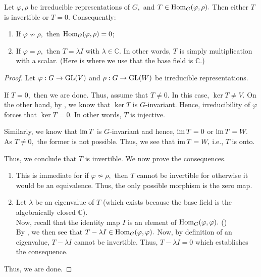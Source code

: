 \begin{lem} \label{lem:schur}
	Let $\varphi, \rho$ be irreducible representations of $G,$ and $T \in \operatorname{Hom}_{G}(\varphi, \rho).$ Then either $T$ is invertible or $T = 0.$ Consequently:
	\begin{enumerate}
		\item If $\varphi \not\sim \rho,$ then $\operatorname{Hom}_{G}(\varphi, \rho) = 0$;
		\item If $\varphi = \rho,$ then $T = \lambda I$ with $\lambda \in \mathbb{C}.$ In other words, $T$ is simply multiplication with a scalar. (Here is where we use that the base field is $\mathbb{C}.$)
	\end{enumerate}
\end{lem}
\begin{proof} 
	Let $\varphi : G \to \operatorname{GL}(V)$ and $\rho : G \to \operatorname{GL}(W)$ be irreducible representations.

	If $T = 0,$ then we are done. Thus, assume that $T \neq 0.$ In this case, $\ker T \neq V.$ On the other hand, by , we know that $\ker T$ is $G$-invariant. Hence, irreducibility of $\varphi$ forces that $\ker T = 0.$ In other words, $T$ is injective.

	Similarly, we know that $\operatorname{im} T$ is $G$-invariant and hence, $\operatorname{im} T = 0$ or $\operatorname{im} T = W.$ As $T \neq 0,$ the former is not possible. Thus, we see that $\operatorname{im} T	= W,$ i.e., $T$ is onto.

	Thus, we conclude that $T$ is invertible. We now prove the consequences.
	\begin{enumerate}
		\item This is immediate for if $\varphi\not\sim\rho,$ then $T$ cannot be invertible for otherwise it would be an equivalence. Thus, the only possible morphism is the zero map.
		\item Let $\lambda$ be an eigenvalue of $T$ (which exists because the base field is the algebraically closed $\mathbb{C}$).\\
		Now, recall that the identity map $I$ is an element of $\operatorname{Hom}_{G}(\varphi, \varphi).$ ()\\
		By , we then see that $T - \lambda I \in \operatorname{Hom}_{G}(\varphi, \varphi).$ Now, by definition of an eigenvalue, $T - \lambda I$ cannot be invertible. Thus, $T - \lambda I = 0$ which establishes the consequence.
	\end{enumerate}
	Thus, we are done.
\end{proof}

